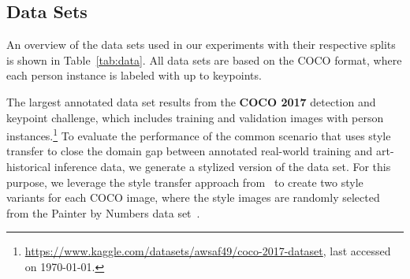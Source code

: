 \documentclass[sigconf]{acmart}
\begin{document}
\subsection{Data Sets}
\label{chp:datasets}

An overview of the data sets used in our experiments with their respective splits is shown in Table~\ref{tab:data}. 
All data sets are based on the \ac{COCO} format, where each person instance is labeled with up to  keypoints.

The largest annotated data set results from the \textbf{COCO 2017} detection and keypoint challenge, which includes  training and  validation images with person instances.\footnote{\url{https://www.kaggle.com/datasets/awsaf49/coco-2017-dataset}, last accessed on \today.} 
To evaluate the performance of the common scenario that uses style transfer to close the domain gap between annotated real-world training and art-historical inference data, we generate a stylized version of the data set. 
For this purpose, we leverage the style transfer approach from~\citet{chen2021artistic} to create two style variants for each \ac{COCO} image, where the style images are randomly selected from the Painter by Numbers data set~\cite{painter}.
\end{document}
